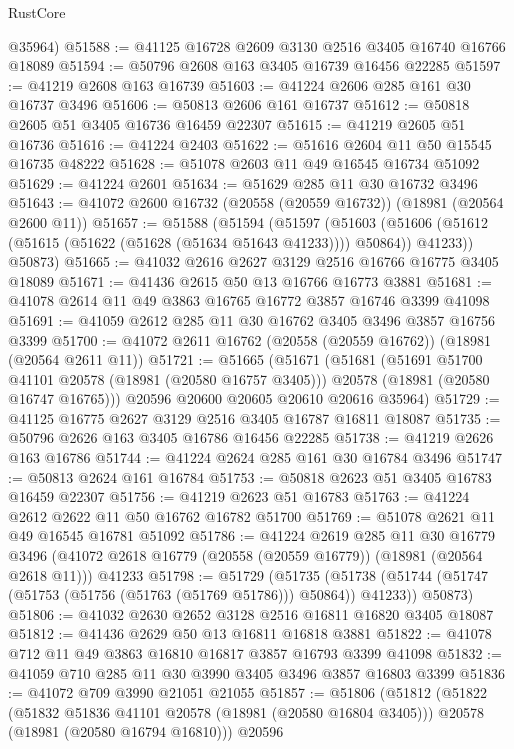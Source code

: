 \begin{lexlean}{RustCore}
\begin{coremodule}
      @35964)
@51588 := @41125 @16728 @2609 @3130 @2516 @3405 @16740 @16766 @18089
@51594 := @50796 @2608 @163 @3405 @16739 @16456 @22285
@51597 := @41219 @2608 @163 @16739
@51603 := @41224 @2606 @285 @161 @30 @16737 @3496
@51606 := @50813 @2606 @161 @16737
@51612 := @50818 @2605 @51 @3405 @16736 @16459 @22307
@51615 := @41219 @2605 @51 @16736
@51616 := @41224 @2403
@51622 := @51616 @2604 @11 @50 @15545 @16735 @48222
@51628 := @51078 @2603 @11 @49 @16545 @16734 @51092
@51629 := @41224 @2601
@51634 := @51629 @285 @11 @30 @16732 @3496
@51643 := @41072 @2600 @16732 (@20558 (@20559 @16732)) (@18981 (@20564 @2600 @11))
@51657 := @51588
    (@51594
      (@51597
        (@51603 (@51606 (@51612 (@51615 (@51622 (@51628 (@51634 @51643 @41233)))) @50864)) @41233))
      @50873)
@51665 := @41032 @2616 @2627 @3129 @2516 @16766 @16775 @3405 @18089
@51671 := @41436 @2615 @50 @13 @16766 @16773 @3881
@51681 := @41078 @2614 @11 @49 @3863 @16765 @16772 @3857 @16746 @3399 @41098
@51691 := @41059 @2612 @285 @11 @30 @16762 @3405 @3496 @3857 @16756 @3399
@51700 := @41072 @2611 @16762 (@20558 (@20559 @16762)) (@18981 (@20564 @2611 @11))
@51721 := @51665
    (@51671
      (@51681
        (@51691 @51700 @41101 @20578 (@18981 (@20580 @16757 @3405)))
        @20578
        (@18981 (@20580 @16747 @16765)))
      @20596
      @20600
      @20605
      @20610
      @20616
      @35964)
@51729 := @41125 @16775 @2627 @3129 @2516 @3405 @16787 @16811 @18087
@51735 := @50796 @2626 @163 @3405 @16786 @16456 @22285
@51738 := @41219 @2626 @163 @16786
@51744 := @41224 @2624 @285 @161 @30 @16784 @3496
@51747 := @50813 @2624 @161 @16784
@51753 := @50818 @2623 @51 @3405 @16783 @16459 @22307
@51756 := @41219 @2623 @51 @16783
@51763 := @41224 @2612 @2622 @11 @50 @16762 @16782 @51700
@51769 := @51078 @2621 @11 @49 @16545 @16781 @51092
@51786 := @41224
    @2619
    @285
    @11
    @30
    @16779
    @3496
    (@41072 @2618 @16779 (@20558 (@20559 @16779)) (@18981 (@20564 @2618 @11)))
    @41233
@51798 := @51729
    (@51735
      (@51738 (@51744 (@51747 (@51753 (@51756 (@51763 (@51769 @51786))) @50864)) @41233))
      @50873)
@51806 := @41032 @2630 @2652 @3128 @2516 @16811 @16820 @3405 @18087
@51812 := @41436 @2629 @50 @13 @16811 @16818 @3881
@51822 := @41078 @712 @11 @49 @3863 @16810 @16817 @3857 @16793 @3399 @41098
@51832 := @41059 @710 @285 @11 @30 @3990 @3405 @3496 @3857 @16803 @3399
@51836 := @41072 @709 @3990 @21051 @21055
@51857 := @51806
    (@51812
      (@51822
        (@51832 @51836 @41101 @20578 (@18981 (@20580 @16804 @3405)))
        @20578
        (@18981 (@20580 @16794 @16810)))
      @20596

\end{coremodule}
\end{lexlean}

